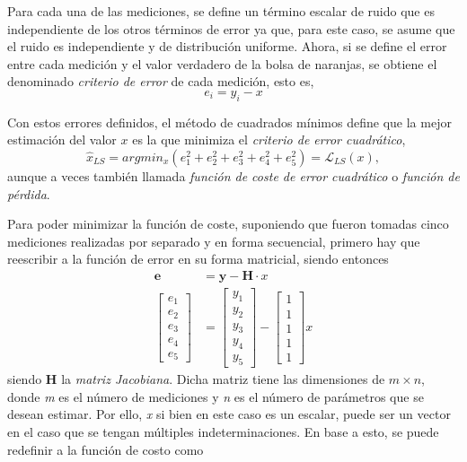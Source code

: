 Para cada una de las mediciones, se define un término escalar de ruido que es independiente de los otros términos de error ya que, para este caso, se asume que el ruido es independiente y de distribución uniforme. Ahora, si se define el error entre cada medición y el valor verdadero de la bolsa de naranjas, se obtiene el denominado \textit{criterio de error} de cada medición, esto es,
\begin{equation}
    e_i = y_i - x
\end{equation}

Con estos errores definidos, el método de cuadrados mínimos define que la mejor estimación del valor $x$ es la que minimiza el \textit{criterio de error cuadrático},
\begin{equation}
    \hat{x}_{LS} = argmin_x(e_1^2+e_2^2+e_3^2+e_4^2+e_5^2) = \mathscr{L}_{LS}(x),
    \label{eq:squarederrorcriterion}
\end{equation}
aunque a veces también llamada \textit{función de coste de error cuadrático} o \textit{función de pérdida}.


% 

Para poder minimizar la función de coste, suponiendo que fueron tomadas cinco mediciones realizadas por separado y en forma secuencial, primero hay que reescribir a la función de error en su forma matricial, siendo entonces
\begin{align}
    \bm{e} &= \bm{y} - \bm{H}\cdot x \\
    \begin{bmatrix}
        e_1\\ e_2\\ e_3\\ e_4\\ e_5
    \end{bmatrix}
    &= 
    \begin{bmatrix}
        y_1\\ y_2\\ y_3\\ y_4\\ y_5
    \end{bmatrix}
    -
    \begin{bmatrix}
        1\\ 1\\ 1\\ 1\\ 1
    \end{bmatrix}
    x
\end{align}
siendo $\bm{H}$ la \textit{matriz Jacobiana}. Dicha matriz tiene las dimensiones de $m\times n$, donde \textit{m} es el número de mediciones y \textit{n} es el número de parámetros que se desean estimar. Por ello, \textit{x} si bien en este caso es un escalar, puede ser un vector en el caso que se tengan múltiples indeterminaciones. En base a esto, se puede redefinir a la función de costo como


